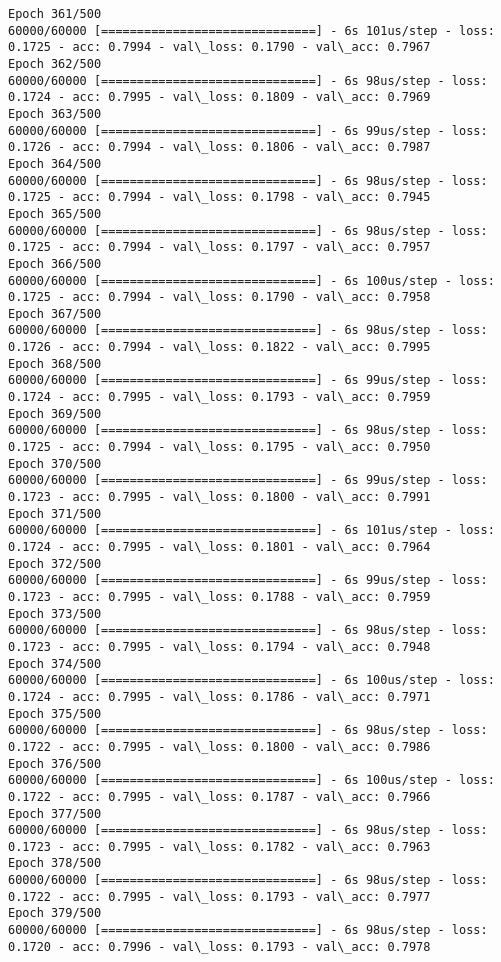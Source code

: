\documentclass[11pt]{article}
\begin{document}
\begin{Verbatim}[commandchars=\\\{\}]
Epoch 361/500
60000/60000 [==============================] - 6s 101us/step - loss: 0.1725 - acc: 0.7994 - val\_loss: 0.1790 - val\_acc: 0.7967
Epoch 362/500
60000/60000 [==============================] - 6s 98us/step - loss: 0.1724 - acc: 0.7995 - val\_loss: 0.1809 - val\_acc: 0.7969
Epoch 363/500
60000/60000 [==============================] - 6s 99us/step - loss: 0.1726 - acc: 0.7994 - val\_loss: 0.1806 - val\_acc: 0.7987
Epoch 364/500
60000/60000 [==============================] - 6s 98us/step - loss: 0.1725 - acc: 0.7994 - val\_loss: 0.1798 - val\_acc: 0.7945
Epoch 365/500
60000/60000 [==============================] - 6s 98us/step - loss: 0.1725 - acc: 0.7994 - val\_loss: 0.1797 - val\_acc: 0.7957
Epoch 366/500
60000/60000 [==============================] - 6s 100us/step - loss: 0.1725 - acc: 0.7994 - val\_loss: 0.1790 - val\_acc: 0.7958
Epoch 367/500
60000/60000 [==============================] - 6s 98us/step - loss: 0.1726 - acc: 0.7994 - val\_loss: 0.1822 - val\_acc: 0.7995
Epoch 368/500
60000/60000 [==============================] - 6s 99us/step - loss: 0.1724 - acc: 0.7995 - val\_loss: 0.1793 - val\_acc: 0.7959
Epoch 369/500
60000/60000 [==============================] - 6s 98us/step - loss: 0.1725 - acc: 0.7994 - val\_loss: 0.1795 - val\_acc: 0.7950
Epoch 370/500
60000/60000 [==============================] - 6s 99us/step - loss: 0.1723 - acc: 0.7995 - val\_loss: 0.1800 - val\_acc: 0.7991
Epoch 371/500
60000/60000 [==============================] - 6s 101us/step - loss: 0.1724 - acc: 0.7995 - val\_loss: 0.1801 - val\_acc: 0.7964
Epoch 372/500
60000/60000 [==============================] - 6s 99us/step - loss: 0.1723 - acc: 0.7995 - val\_loss: 0.1788 - val\_acc: 0.7959
Epoch 373/500
60000/60000 [==============================] - 6s 98us/step - loss: 0.1723 - acc: 0.7995 - val\_loss: 0.1794 - val\_acc: 0.7948
Epoch 374/500
60000/60000 [==============================] - 6s 100us/step - loss: 0.1724 - acc: 0.7995 - val\_loss: 0.1786 - val\_acc: 0.7971
Epoch 375/500
60000/60000 [==============================] - 6s 98us/step - loss: 0.1722 - acc: 0.7995 - val\_loss: 0.1800 - val\_acc: 0.7986
Epoch 376/500
60000/60000 [==============================] - 6s 100us/step - loss: 0.1722 - acc: 0.7995 - val\_loss: 0.1787 - val\_acc: 0.7966
Epoch 377/500
60000/60000 [==============================] - 6s 98us/step - loss: 0.1723 - acc: 0.7995 - val\_loss: 0.1782 - val\_acc: 0.7963
Epoch 378/500
60000/60000 [==============================] - 6s 98us/step - loss: 0.1722 - acc: 0.7995 - val\_loss: 0.1793 - val\_acc: 0.7977
Epoch 379/500
60000/60000 [==============================] - 6s 98us/step - loss: 0.1720 - acc: 0.7996 - val\_loss: 0.1793 - val\_acc: 0.7978

\end{Verbatim}
\end{document}
